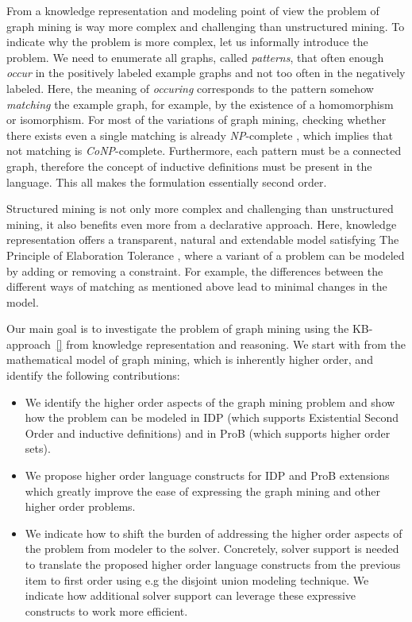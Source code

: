 From a knowledge representation and modeling point of view the problem of graph mining is way more complex and challenging than unstructured mining. 
To indicate why the problem is more complex, let us informally introduce the problem. We need to enumerate all graphs, called \textit{patterns}, that often enough \textit{occur} in the positively labeled example graphs and not too often in the negatively labeled.
Here, the meaning of \textit{occuring} corresponds to the pattern somehow \emph{matching} the example graph, for example, by the existence of a homomorphism or isomorphism.
For most of the variations of graph mining, checking whether there exists even a single matching is already \textit{NP}-complete \citep{subtree_overview}, which implies that not matching is \textit{CoNP}-complete. 
Furthermore, each pattern must be a connected graph, therefore the concept of inductive definitions must be present in the language.
This all makes the formulation essentially second order.

Structured mining is not only more complex and challenging than unstructured mining, it also benefits even more from a declarative approach.
Here, knowledge representation offers a transparent, natural and extendable model satisfying The Principle of Elaboration Tolerance \citep{elaboration_tolerance}, where a variant of a problem can be modeled by adding or removing a constraint.
For example, the differences between the different ways of matching as mentioned above lead to minimal changes in the model.

Our main goal is to investigate the problem of graph mining using the KB-approach~\ref{} from knowledge representation and reasoning. 
We start with from the mathematical model of graph mining, which is inherently higher order, and identify the following contributions:

\begin{itemize}
\item We identify the higher order aspects of the graph mining problem and show how the problem can be modeled in IDP (which supports Existential Second Order and inductive definitions) and in ProB (which supports higher order sets).
\item We propose higher order language constructs for IDP and ProB extensions which greatly improve the ease of expressing the graph mining and other higher order problems.
\item We indicate how to shift the burden of addressing the higher order aspects of the problem from modeler to the solver. 
Concretely, solver support is needed to translate the proposed higher order language constructs from the previous item to first order using e.g the disjoint union modeling technique.
We indicate how additional solver support can leverage these expressive constructs to work more efficient.
\end{itemize}

